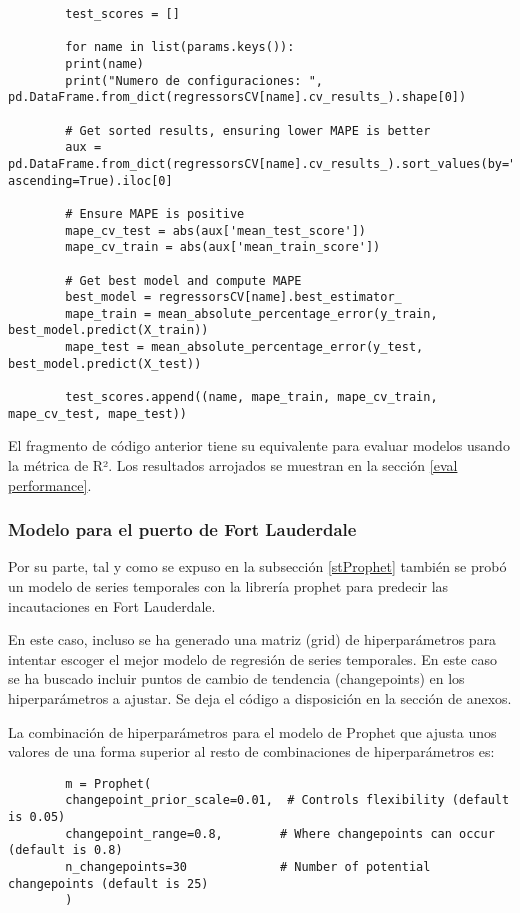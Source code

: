 \documentclass[12pt]{article}
\begin{document}
 	\begin{verbatim}
 		test_scores = []
 		
 		for name in list(params.keys()):
 		print(name)
 		print("Numero de configuraciones: ", pd.DataFrame.from_dict(regressorsCV[name].cv_results_).shape[0])
 		
 		# Get sorted results, ensuring lower MAPE is better
 		aux = pd.DataFrame.from_dict(regressorsCV[name].cv_results_).sort_values(by="mean_test_score", ascending=True).iloc[0]
 		
 		# Ensure MAPE is positive
 		mape_cv_test = abs(aux['mean_test_score'])
 		mape_cv_train = abs(aux['mean_train_score'])
 		
 		# Get best model and compute MAPE
 		best_model = regressorsCV[name].best_estimator_
 		mape_train = mean_absolute_percentage_error(y_train, best_model.predict(X_train))
 		mape_test = mean_absolute_percentage_error(y_test, best_model.predict(X_test))
 		
 		test_scores.append((name, mape_train, mape_cv_train, mape_cv_test, mape_test))
 	\end{verbatim}
 	El fragmento de código anterior tiene su equivalente para evaluar modelos usando la métrica de R². Los resultados arrojados se muestran en la sección \ref{eval performance}.
 	
 	\subsubsection{\label{FL model} Modelo para el puerto de Fort Lauderdale}
 	Por su parte, tal y como se expuso en la subsección \ref{stProphet} también se probó un modelo de series temporales con la librería prophet para predecir las incautaciones en Fort Lauderdale.
 	
 	En este caso, incluso se ha generado una matriz (grid) de hiperparámetros para intentar escoger el mejor modelo de regresión de series temporales. En este caso se ha buscado incluir puntos de cambio de tendencia (changepoints) en los hiperparámetros a ajustar.
 	Se deja el código a disposición en la sección de anexos.
 	
 	La combinación de hiperparámetros para el modelo de Prophet que ajusta unos valores de una forma superior al resto de combinaciones de hiperparámetros es:
 	
 	\begin{verbatim}
 		m = Prophet(
 		changepoint_prior_scale=0.01,  # Controls flexibility (default is 0.05)
 		changepoint_range=0.8,        # Where changepoints can occur (default is 0.8)
 		n_changepoints=30             # Number of potential changepoints (default is 25)
 		)
 	\end{verbatim}
 
\end{document}
